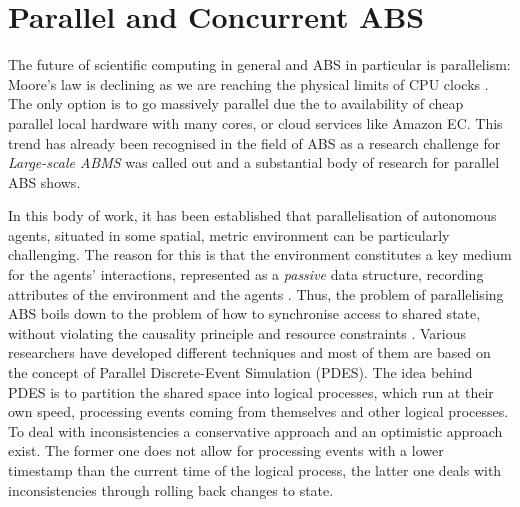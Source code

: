 \chapter{Parallel and Concurrent ABS}
\label{ch:parallel_abs}
The future of scientific computing in general and ABS in particular is parallelism: Moore's law is declining as we are reaching the physical limits of CPU clocks \cite{sutter2005free}. The only option is to go massively parallel due the to availability of cheap parallel local hardware with many cores, or cloud services like Amazon EC. This trend has already been recognised in the field of ABS as a research challenge for \textit{Large-scale ABMS} \cite{macal_everything_2016} was called out and a substantial body of research for parallel ABS shows.

In this body of work, it has been established that parallelisation of autonomous agents, situated in some spatial, metric environment can be particularly challenging. The reason for this is that the environment constitutes a key medium for the agents' interactions, represented as a \textit{passive} data structure, recording attributes of the environment and the agents \cite{lees_using_2008}. Thus, the problem of parallelising ABS boils down to the problem of how to synchronise access to shared state, without violating the causality principle and resource constraints \cite{logan_distributed_2001, suryanarayanan_pdes-mas_2013}. Various researchers have developed different techniques and most of them are based on the concept of Parallel Discrete-Event Simulation (PDES). The idea behind PDES is to partition the shared space into logical processes, which run at their own speed, processing events coming from themselves and other logical processes. To deal with inconsistencies a conservative approach and an optimistic approach exist. The former one does not allow for processing events with a lower timestamp than the current time of the logical process, the latter one deals with inconsistencies through rolling back changes to state.

